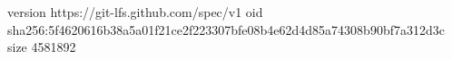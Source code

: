version https://git-lfs.github.com/spec/v1
oid sha256:5f4620616b38a5a01f21ce2f223307bfe08b4e62d4d85a74308b90bf7a312d3c
size 4581892
